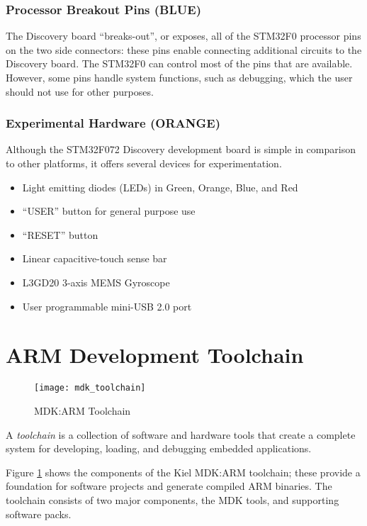 \documentclass[openany,11pt,fleqn]{book} %
\begin{document}
\subsubsection*{Processor Breakout Pins ({\color{blue!90!black}BLUE})}	

The Discovery board ``breaks-out'', or exposes, all of the STM32F0 processor pins on the two side connectors: these pins enable connecting additional circuits to the Discovery board. The STM32F0 can control most of the pins that are available. However, some pins handle system functions, such as debugging, which the user should not use for other purposes. 
\newpage
\subsubsection*{Experimental Hardware  ({\color{orange!90!black}ORANGE})}
Although the STM32F072 Discovery development board is simple in comparison to other platforms, it offers several devices for experimentation.

\begin{itemize}
	\item Light emitting diodes (LEDs) in Green, Orange, Blue, and Red
	\item ``USER'' button for general purpose use
	\item ``RESET'' button
	\item Linear capacitive-touch sense bar
	\item L3GD20 3-axis MEMS Gyroscope
	\item User programmable mini-USB 2.0 port
\end{itemize}
	

\section{\color{orange}ARM Development Toolchain}

\begin{figure}[b!]
	\centering\texttt{[image: mdk\_toolchain]}
	\caption{MDK:ARM Toolchain}
	\label{mdk_toolchain}
\end{figure}

A \textit{toolchain} is a collection of software and hardware tools that create a complete system for developing, loading, and debugging embedded applications. 

Figure \ref{mdk_toolchain} shows the components of the Kiel MDK:ARM toolchain; these provide a foundation for software projects and generate compiled ARM binaries. 
The toolchain consists of two major components, the MDK tools, and supporting software packs.
\end{document}
